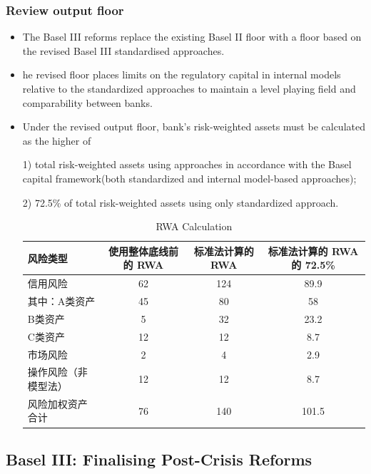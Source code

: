 \subsubsection{Review output floor}
\begin{itemize}
\item The Basel III reforms replace the existing Basel II floor with a floor based on the revised Basel III standardised approaches.
\item he revised floor places limits on the regulatory capital in internal models relative to the standardized approaches to maintain a level playing field and comparability between banks.
\item Under the revised output floor, bank's risk-weighted assets must be calculated as the higher of 

1) total risk-weighted assets using approaches in accordance with the Basel capital framework(both standardized and internal model-based approaches); 

2) 72.5\% of total risk-weighted assets using only standardized approach.

\begin{table}[h]
    \centering
    \caption{RWA Calculation}
    \renewcommand{\arraystretch}{1.5} %
    \begin{tabular}{|l|c|c|c|}
        \hline
        \textbf{风险类型} & \textbf{使用整体底线前的 RWA} & \textbf{标准法计算的 RWA} & \textbf{标准法计算的 RWA 的 72.5\%} \\
        \hline
        信用风险 & 62 & 124 & 89.9 \\
        \hline
        其中：A类资产 & 45 & 80 & 58 \\
        \hline
        B类资产 & 5 & 32 & 23.2 \\
        \hline
        C类资产 & 12 & 12 & 8.7 \\
        \hline
        市场风险 & 2 & 4 & 2.9 \\
        \hline
        操作风险（非模型法） & 12 & 12 & 8.7 \\
        \hline
        风险加权资产合计 & 76 & 140 & 101.5 \\
        \hline
    \end{tabular}
\end{table}
\end{itemize}





\subsection{Basel III: Finalising Post-Crisis Reforms}



